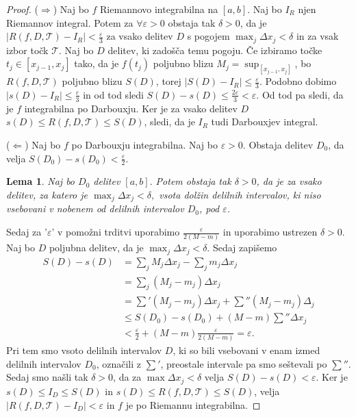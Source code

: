 \documentclass[10pt, a4paper]{article}
\newtheorem{lema}[izr]{Lema}
\newenvironment{noticeC}{%
  \tcolorbox[%
  notitle,
  empty,
  enhanced,  %
  breakable,
  coltext=black, 
  fontupper=\rmfamily,
  noparskip,
  sharp corners,
  boxrule=-1pt,  %
  frame hidden,
  left=7pt,  %
  right=7pt,
  top=5pt,
  bottom=5pt,
  before skip=2.5ex plus 2pt,
  after skip=2.5ex plus 2pt,
  overlay unbroken and last={%
  },
  ]}
{\endtcolorbox}
\newenvironment{dokaz}%
  {\begin{noticeC}\begin{proof}}%
  {\end{proof}\end{noticeC}}
\begin{document}
\begin{dokaz}
    ($\Rightarrow$) Naj bo $f$ Riemannovo integrabilna na $[a, b]$. Naj bo $I_R$ njen Riemannov integral.
    Potem za $\forall \varepsilon > 0$ obstaja tak $\delta > 0$, da je $|R(f, D, \mathcal{T}) - I_R| < \frac{\varepsilon}{3}$ za vsako delitev $D$ s pogojem $\max_j \Delta x_j < \delta$ in za vsak izbor točk $\mathcal{T}$.
    Naj bo $D$ delitev, ki zadošča temu pogoju.
    Če izbiramo točke $t_j \in [x_{j-1} , x_j]$ tako, da je $f(t_j)$ poljubno blizu $M_j = \sup_{[x_{j-1}, x_j]}$, bo $R(f, D, \mathcal{T})$ poljubno blizu $S(D)$, torej $|S(D) - I_R| \leq \frac{\varepsilon}{3}$.
    Podobno dobimo $|s(D) - I_R| \leq \frac{\varepsilon}{3}$ in od tod sledi $S(D) - s(D) \leq \frac{2 \varepsilon}{3} < \varepsilon$.
    Od tod pa sledi, da je $f$ integrabilna po Darbouxju. Ker je za vsako delitev $D$
    $s(D) \leq R(f, D, \mathcal{T}) \leq S(D)$, sledi, da je $I_R$ tudi Darbouxjev integral.

    ($\Leftarrow$) Naj bo $f$ po Darbouxju integrabilna. Naj bo $\varepsilon > 0.$
    Obstaja delitev $D_0$, da velja $S(D_0) - s(D_0) < \frac{\varepsilon}{2}$.
    \begin{lema}
        Naj bo $D_0$ delitev $[a, b].$ Potem obstaja tak $\delta > 0$, da je za vsako delitev, za katero je $\max_j \Delta x_j < \delta,$ vsota dolžin delilnih intervalov, ki niso vsebovani v nobenem od delilnih intervalov $D_0$, pod $\varepsilon$.
    \end{lema}
        Sedaj za '$\varepsilon$' v pomožni trditvi uporabimo $\frac{\varepsilon}{2(M - m)}$ in uporabimo ustrezen $\delta > 0$.
        Naj bo $D$ poljubna delitev, da je $\max_{j} \Delta x_j < \delta.$ Sedaj zapišemo
        \begin{align*}
            S(D) - s(D) &= \sum_j M_j \Delta x_j - \sum _j m_j \Delta x_j\\
            &= \sum_j (M_j - m_j) \Delta x_j\\
            &= \sum ' (M_j - m_j) \Delta x_j + \sum '' (M_j - m_j) \Delta_j\\
            &\leq S(D_0) - s(D_0) + (M - m) \sum '' \Delta x_j\\
            &< \frac{\varepsilon}{2} + (M-m) \frac{\varepsilon}{2(M-m)} = \varepsilon.
        \end{align*}
        Pri tem smo vsoto delilnih intervalov $D$, ki so bili vsebovani v enam izmed delilnih intervalov $D_0$, označili z $\sum'$, preostale intervale pa smo seštevali po $\sum''$.
        Sedaj smo našli tak $\delta > 0$, da za $\max \Delta x_j < \delta$ velja $S(D) - s(D) < \varepsilon.$
        Ker je $s(D) \leq I_D \leq S(D)$ in $s(D) \leq R(f, D, \mathcal{T}) \leq S(D)$, velja $|R(f, D, \mathcal{T}) - I_D| < \varepsilon$ in $f$ je po Riemannu integrabilna.
\end{dokaz}
\end{document}
